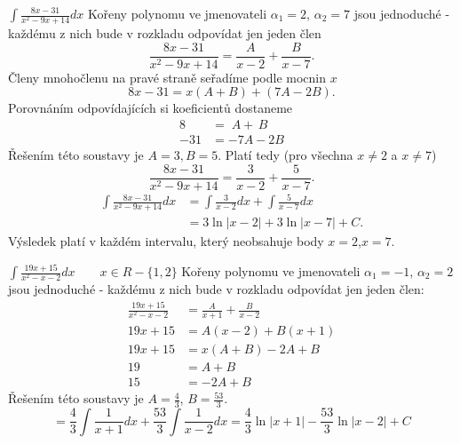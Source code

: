       \begin{example}$\displaystyle\int{\frac{8x-31}{x^2-9x+14}}dx$\cite[s.~90]{Knichal}\newline
        Kořeny polynomu ve jmenovateli $\alpha_1 = 2$, $\alpha_2 = 7$ jsou jednoduché - každému z
        nich bude v rozkladu odpovídat jen jeden člen $$\frac{8x-31}{x^2-9x+14} = \frac{A}{x-2}
        + \frac{B}{x-7}.$$ Členy mnohočlenu na pravé straně seřadíme podle mocnin $x$ $$8x-31 =
         x(A+B)+(7A-2B).$$ Porovnáním odpovídajících si koeficientů dostaneme
        \begin{align*}
          8   &=   \; A + \, B \\
          -31 &= -7A - 2B
        \end{align*}
        Řešením této soustavy je $A = 3, B = 5$. Platí tedy (pro všechna $x \neq 2$ a $x \neq 7$)
        $$\frac{8x-31}{x^2-9x+14} = \frac{3}{x-2} + \frac{5}{x-7}.$$
        \begin{align*}
          \int{\frac{8x-31}{x^2-9x+14}}dx 
            &= \int{\frac{3}{x-2}}dx + \int{\frac{5}{x-7}}dx      \\
            &= 3\ln|x-2| + 3\ln|x-7| + C.
        \end{align*}
        Výsledek platí v každém intervalu, který neobsahuje body $x = 2$,$x = 7$.
      \end{example}
      
      \begin{example}\label{MA:eq_ex1}$\displaystyle\int{\frac{19x+15}{x^2-x-2}}dx \qquad x\in
        R-\{1,2\} $ \newline Kořeny polynomu ve jmenovateli $\alpha_1 = -1$, $\alpha_2 = 2$ jsou
        jednoduché - každému z nich bude v rozkladu odpovídat jen jeden člen: 
        \begin{align*}
          \frac{19x+15}{x^2-x-2}     &= \frac{A}{x+1} + \frac{B}{x-2} \\
                           19x +15   &= A(x-2) + B(x+1)               \\
                           19x +15   &= x(A+B) - 2A + B               \\
                           19        &= A + B                         \\
                                15   &=        - 2A + B
        \end{align*}              
        Řešením této soustavy je $A = \frac{4}{3}$, $B = \frac{53}{3}$.
        \begin{equation*}
          = \frac{4}{3}\int{\frac{1}{x+1}}dx+\frac{53}{3}\int{\frac{1}{x-2}}dx 
          = \frac{4}{3}\ln|x+1| - \frac{53}{3}\ln|x-2| +  C
        \end{equation*}      
      \end{example}
  
